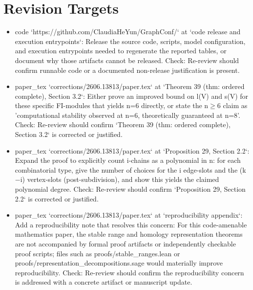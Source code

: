 \documentclass[11pt]{article}
\begin{document}
\section*{Revision Targets}
\begin{itemize}[leftmargin=*]
  \item [open] code `https://github.com/ClaudiaHeYun/GraphConf/` at `code release and execution entrypoints`: Release the source code, scripts, model configuration, and execution entrypoints needed to regenerate the reported tables, or document why those artifacts cannot be released. Check: Re-review should confirm runnable code or a documented non-release justification is present.
  \item [open] paper\_tex `corrections/2606.13813/paper.tex` at `Theorem 39 (thm: ordered complete), Section 3.2`: Either prove an improved bound on l(V) and s(V) for these specific FI-modules that yields n=6 directly, or state the n\ensuremath{\ge}6 claim as 'computational stability observed at n=6, theoretically guaranteed at n=8'. Check: Re-review should confirm `Theorem 39 (thm: ordered complete), Section 3.2` is corrected or justified.
  \item [open] paper\_tex `corrections/2606.13813/paper.tex` at `Proposition 29, Section 2.2`: Expand the proof to explicitly count i-chains as a polynomial in n: for each combinatorial type, give the number of choices for the i edge-slots and the (k\ensuremath{-}i) vertex-slots (post-subdivision), and show this yields the claimed polynomial degree. Check: Re-review should confirm `Proposition 29, Section 2.2` is corrected or justified.
  \item [open] paper\_tex `corrections/2606.13813/paper.tex` at `reproducibility appendix`: Add a reproducibility note that resolves this concern: For this code-amenable mathematics paper, the stable range and homology representation theorems are not accompanied by formal proof artifacts or independently checkable proof scripts; files such as proofs/stable\_ranges.lean or proofs/representation\_decompositions.sage would materially improve reproducibility. Check: Re-review should confirm the reproducibility concern is addressed with a concrete artifact or manuscript update.
\end{itemize}
\end{document}
